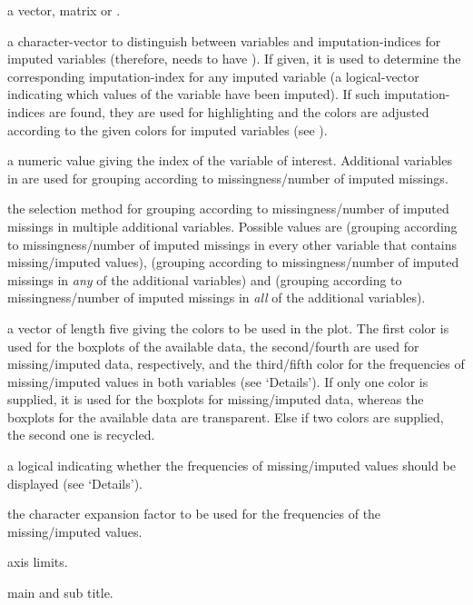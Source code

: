 \begin{Arguments}
\begin{ldescription}
\item[\code{x}] a vector, matrix or .
\item[\code{delimiter}] a character-vector to distinguish between variables
and imputation-indices for imputed variables (therefore,  needs
to have ). If given, it is used to determine the
corresponding imputation-index for any imputed variable (a logical-vector
indicating which values of the variable have been imputed). If such
imputation-indices are found, they are used for highlighting and the
colors are adjusted	according to the given colors for imputed variables
(see ).
\item[\code{pos}] a numeric value giving the index of the variable of 
interest.  Additional variables in  are used for 
grouping according to missingness/number of imputed missings.
\item[\code{selection}] the selection method for grouping according to 
missingness/number of imputed missings in multiple additional variables.
Possible values are  (grouping according to missingness/number
of imputed missings in every other variable that contains missing/imputed values),
 (grouping according to missingness/number of imputed missings in
\emph{any} of the additional variables) and  (grouping according to
missingness/number of imputed missings in \emph{all} of the additional variables).
\item[\code{col}] a vector of length five giving the colors to be used in the 
plot. The first color is used for the boxplots of the available data,
the second/fourth are used for missing/imputed data, respectively, 
and the third/fifth color for the frequencies of missing/imputed values
in both variables (see `Details').  
If only one color is supplied, it is used for the boxplots for missing/imputed 
data, whereas the boxplots for the available data are transparent.  
Else if two colors are supplied, the second one is recycled.
\item[\code{numbers}] a logical indicating whether the frequencies of missing/imputed 
values should be displayed (see `Details').
\item[\code{cex.numbers}] the character expansion factor to be used for the 
frequencies of the missing/imputed values.
\item[\code{xlim, ylim}] axis limits.
\item[\code{main, sub}] main and sub title.

\end{ldescription}
\end{Arguments}
